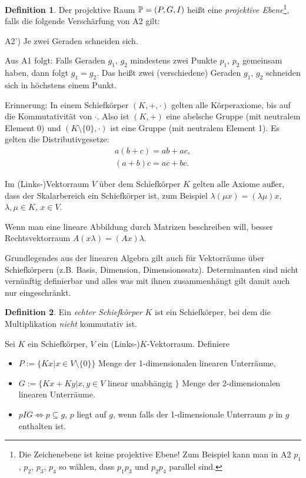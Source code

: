 \documentclass[
 a4paper,
 12pt,
 parskip=half
 ]{scrartcl}
\theoremstyle{plain}
\theoremstyle{definition}
\newtheorem*{defn*}{Definition}
\begin{document}
\begin{defn*}
 Der projektive Raum $\mathbb{P} = (P,G,I)$ heißt eine \emph{projektive Ebene}\footnote{Die Zeichenebene ist keine projektive Ebene! Zum Beispiel kann man in A2 $p_1$, $p_2$, $p_3$, $p_4$ so wählen, dass $p_1 p_3$ und $p_2 p_4$ parallel sind.}, falls die folgende Verschärfung von A2 gilt:
 
 A2') Je zwei Geraden schneiden sich.
\end{defn*}

\begin{bem}
 Aus A1 folgt: Falls Geraden $g_1$, $g_2$ mindestens zwei Punkte $p_1$, $p_2$ gemeinsam haben, dann folgt $g_1 = g_2$. Das heißt zwei (verschiedene) Geraden $g_1$, $g_2$ schneiden sich in höchstens einem Punkt.
\end{bem}

Erinnerung: In einem Schiefkörper $(K, +, \cdot)$ gelten alle Körperaxiome, bis auf die Kommutativität von $\cdot$. Also ist $(K, +)$ eine abelsche Gruppe (mit neutralem Element $0$) und $(K \setminus \{ 0 \}, \cdot)$ ist eine Gruppe (mit neutralem Element 1). Es gelten die Distributivgesetze:
\begin{align*}
 a(b+c) = ab + ac, \\
 (a+b)c = ac + bc.
\end{align*}

Im (Links-)Vektorraum $V$ über dem Schiefkörper $K$ gelten alle Axiome außer, dass der Skalarbereich ein Schiefkörper ist, zum Beispiel $\lambda( \mu x ) = (\lambda \mu) x$, $\lambda, \mu \in K$, $x \in V$.

Wenn man eine lineare Abbildung durch Matrizen beschreiben will, besser Rechtsvektorraum $A(x\lambda) = (Ax) \lambda$.

\begin{bem}
 Grundlegendes aus der linearen Algebra gilt auch für Vektorräume über Schiefkörpern (z.B. Basis, Dimension, Dimensionssatz). Determinanten sind nicht vernünf\-tig definierbar und alles was mit ihnen zusammenhängt gilt damit auch nur eingeschränkt.
\end{bem}

\begin{defn*}
 Ein \emph{echter Schiefkörper} $K$ ist ein Schiefkörper, bei dem die Multiplikation \emph{nicht} kommutativ ist.
\end{defn*}

Sei $K$ ein Schiefkörper, $V$ ein (Links-)$K$-Vektorraum. Definiere
\begin{itemize}
 \item $P := \{ Kx | x \in V \setminus \{ 0 \} \}$ Menge der 1-dimensionalen linearen Unterräume,
 \item $G := \{ Kx + Ky | x, y \in V $ linear unabhängig $\}$ Menge der 2-dimensionalen linearen Unterräume.
 \item $p I G \Leftrightarrow p \subseteq g$, $p$ liegt auf $g$, wenn falls der 1-dimensionale Unterraum $p$ in $g$ enthalten ist.
\end{itemize}
\end{document}
